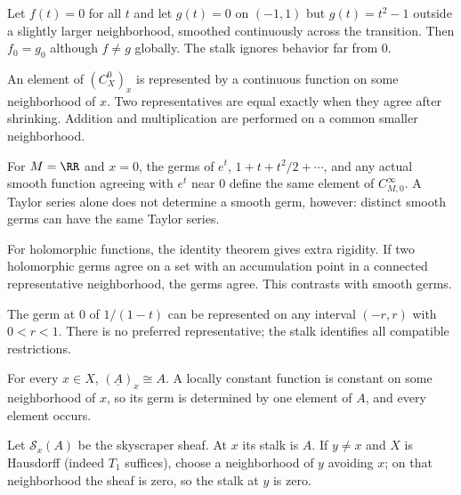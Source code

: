 \begin{example}
Let $f(t)=0$ for all $t$ and let $g(t)=0$ on $(-1,1)$ but $g(t)=t^2-1$ outside a slightly
larger neighborhood, smoothed continuously across the transition.  Then $f_0=g_0$ although
$f\neq g$ globally.  The stalk ignores behavior far from $0$.
\end{example}

\begin{example}
An element of $(C^0_X)_x$ is represented by a continuous function on some neighborhood of
$x$.  Two representatives are equal exactly when they agree after shrinking.  Addition and
multiplication are performed on a common smaller neighborhood.
\end{example}

\begin{example}
For $M=\RR$ and $x=0$, the germs of $e^t$, $1+t+t^2/2+\cdots$, and any actual smooth
function agreeing with $e^t$ near $0$ define the same element of $C^\infty_{M,0}$.  A Taylor
series alone does not determine a smooth germ, however: distinct smooth germs can have the
same Taylor series.
\end{example}

\begin{example}
For holomorphic functions, the identity theorem gives extra rigidity.  If two holomorphic
germs agree on a set with an accumulation point in a connected representative neighborhood,
the germs agree.  This contrasts with smooth germs.
\end{example}

\begin{example}
The germ at $0$ of $1/(1-t)$ can be represented on any interval $(-r,r)$ with $0<r<1$.
There is no preferred representative; the stalk identifies all compatible restrictions.
\end{example}

\begin{example}
For every $x\in X$, $(\underline A)_x\cong A$.  A locally constant function is constant on
some neighborhood of $x$, so its germ is determined by one element of $A$, and every element
occurs.
\end{example}

\begin{example}
Let $\mathcal S_x(A)$ be the skyscraper sheaf.  At $x$ its stalk is $A$.  If $y\neq x$ and
$X$ is Hausdorff (indeed $T_1$ suffices), choose a neighborhood of $y$ avoiding $x$; on that
neighborhood the sheaf is zero, so the stalk at $y$ is zero.
\end{example}

